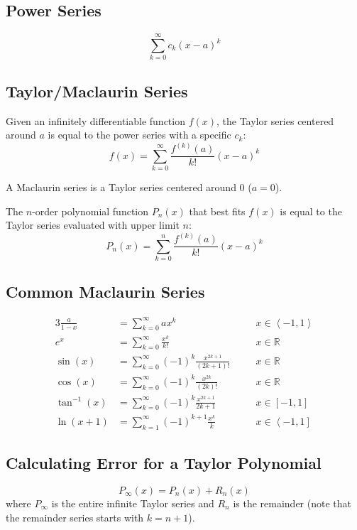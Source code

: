 \documentclass[12pt]{article}
\newcommand*{\R}{\mathbb{R}}
\newcommand*{\atan}{\tan^{-1}}
\newcommand*{\isum}[1]{\sum\limits_{#1}^\infty}
\newcommand*{\fixmath}{%
  \makebox{}\vspace{\glueexpr-\baselineskip-\abovedisplayskip}}
\newenvironment{fixaskip}{\setlength{\abovedisplayskip}{0pt}\fixmath%
  \ignorespaces}{\ignorespacesafterend}
\newenvironment{fixskip}{\setlength{\abovedisplayskip}{0pt}%
  \setlength{\belowdisplayskip}{0pt}\fixmath\ignorespaces}%
  {\ignorespacesafterend}
\begin{document}
\subsection*{Power Series}
\begin{fixskip}
  \[
    \isum{k=0} c_k{(x-a)}^k
  \]
\end{fixskip}
\subsection*{Taylor\slash Maclaurin Series}
Given an infinitely differentiable function \(f(x)\), the Taylor series
centered around \(a\) is equal to the power series with a specific \(c_k\):
\[
  f(x) = \isum{k=0} \frac{f^{(k)}(a)}{k!}{(x-a)}^k
\]

A Maclaurin series is a Taylor series centered around 0 (\(a = 0\)).

The \(n\)-order polynomial function \(P_n(x)\) that best fits \(f(x)\) is
equal to the Taylor series evaluated with upper limit \(n\):
\[
  P_n(x) = \sum_{k=0}^{n} \frac{f^{(k)}(a)}{k!}{(x-a)}^k
\]
\subsection*{Common Maclaurin Series}
\begin{fixskip}
  \begin{alignat*}{3}
    \frac{a}{1-x} &= \isum{k=0} ax^k &&\quad x \in \left<-1,1\right>\\
    e^x &= \isum{k=0} \frac{x^k}{k!} &&\quad x \in \R\\
    \sin(x) &= \isum{k=0} {(-1)}^k \frac{x^{2k+1}}{(2k+1)!} &&\quad x \in \R\\
    \cos(x) &= \isum{k=0} {(-1)}^k \frac{x^{2k}}{(2k)!} &&\quad x \in \R\\
    \atan(x) &= \isum{k=0} {(-1)}^k \frac{x^{2k+1}}{2k+1} &&\quad x \in [-1,1]\\
    \ln(x+1) &= \isum{k=1} {(-1)}^{k+1} \frac{x^k}{k} &&\quad x \in
      \left<-1,1\right]
  \end{alignat*}
\end{fixskip}
\subsection*{Calculating Error for a Taylor Polynomial}
\begin{fixaskip}
  \[
    P_\infty(x) = P_n(x) + R_n(x)
  \]
\end{fixaskip}
where \(P_\infty\) is the entire infinite Taylor series and \(R_n\) is the
remainder (note that the remainder series starts with \(k=n+1\)).
\end{document}

